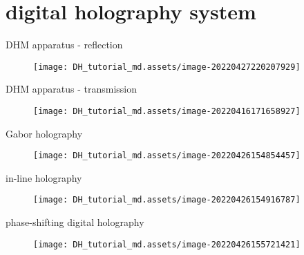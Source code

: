 \documentclass[t, aspectratio=169]{beamer}
\begin{document}
\section{digital holography system}
\begin{frame}[c]
	\centering\LARGE\textbf{\secname}
\end{frame}

\begin{frame}{DHM apparatus - reflection}
	\begin{figure}
		\texttt{[image: DH\_tutorial\_md.assets/image-20220427220207929]}
	\end{figure}
\end{frame}


\begin{frame}{DHM apparatus - transmission}
	\begin{figure}
		\texttt{[image: DH\_tutorial\_md.assets/image-20220416171658927]}
	\end{figure}
\end{frame}


\begin{frame}{Gabor holography}
	\begin{figure}
		\texttt{[image: DH\_tutorial\_md.assets/image-20220426154854457]}
	\end{figure}
\end{frame}


\begin{frame}{in-line holography}
	\begin{figure}
		\texttt{[image: DH\_tutorial\_md.assets/image-20220426154916787]}
	\end{figure}
\end{frame}


\begin{frame}{phase-shifting digital holography}
	\begin{figure}
		\texttt{[image: DH\_tutorial\_md.assets/image-20220426155721421]}
	\end{figure}
\end{frame}
\end{document}

